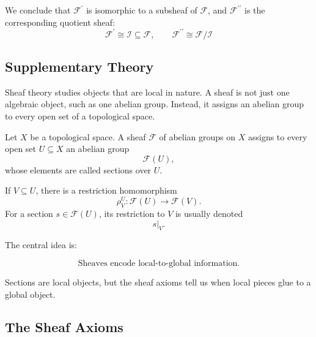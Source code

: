 We conclude that \(\mathcal{F}^{\prime}\) is isomorphic to a subsheaf of
\(\mathcal{F}\), and \(\mathcal{F}^{\prime\prime}\) is the corresponding
quotient sheaf:
\[
\boxed{\mathcal{F}^{\prime}\cong\mathcal I\subseteq\mathcal{F},
\qquad\mathcal{F}^{\prime\prime}\cong\mathcal{F}/\mathcal I}
\]

\subsection*{Supplementary Theory}

Sheaf theory studies objects that are local in nature. A sheaf is not just one algebraic object, such as one abelian group. Instead, it assigns an abelian group to every open set of a topological space.

Let \(X\) be a topological space. A sheaf \(\mathcal{F}\) of abelian groups on \(X\) assigns to every open set \(U\subseteq X\) an abelian group
\[
\mathcal{F}(U),
\]
whose elements are called sections over \(U\).

If \(V\subseteq U\), there is a restriction homomorphism
\[
\rho^U_V:\mathcal{F}(U)\longrightarrow \mathcal{F}(V).
\]
For a section \(s\in \mathcal{F}(U)\), its restriction to \(V\) is usually denoted
\[
s|_V.
\]

The central idea is:

\[
\boxed{\text{Sheaves encode local-to-global information.}}
\]

Sections are local objects, but the sheaf axioms tell us when local pieces glue to a global object.

\subsection{The Sheaf Axioms}

